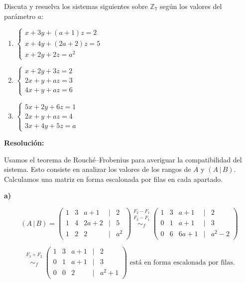 \documentclass[a4paper,12pt]{article}
\begin{document}
\begin{ejercicio}[title=Ejercicio 30]
Discuta y resuelva los sistemas siguientes sobre $\mathbb{Z}_7$ según los valores del parámetro $a$:

\begin{enumerate}
\item[a)] 
$\begin{cases}
x + 3y + (a + 1)z = 2\\
x + 4y + (2a + 2)z = 5\\
x + 2y + 2z = a^2
\end{cases}$

\item[b)] 
$\begin{cases}
x + 2y + 3z = 2\\
2x + y + a z = 3\\
4x + y + a z = 6
\end{cases}$

\item[c)] 
$\begin{cases}
5x + 2y + 6z = 1\\
2x + y + a z = 4\\
3x + 4y + 5z = a
\end{cases}$
\end{enumerate}

\tcblower
\textbf{Resolución:}

Usamos el teorema de Rouché–Frobenius para averiguar la compatibilidad del sistema. Esto consiste en analizar los valores de los rangos de $A$ y $(A\,|\,B)$. Calculamos una matriz en forma escalonada por filas en cada apartado.

\textbf{a)}

\[
(A\,|\,B)=
\begin{pmatrix}
1 & 3 & a+1 &\Big|& 2\\
1 & 4 & 2a+2 &\Big|& 5\\
1 & 2 & 2 &\Big|& a^2
\end{pmatrix}
\overset{\substack{F_2 - F_1 \\ F_3 - F_1}}{\sim_f}
\begin{pmatrix}
1 & 3 & a+1 &\Big|& 2\\
0 & 1 & a+1 &\Big|& 3\\
0 & 6 & 6a+1 &\Big|& a^2-2
\end{pmatrix}
\]

\[
\overset{\substack{F_3 + F_2\\{}}}{\sim_f}
\begin{pmatrix}
1 & 3 & a+1 &\Big|& 2\\
0 & 1 & a+1 &\Big|& 3\\
0 & 0 & 2 &\Big|& a^2+1
\end{pmatrix}
\text{ está en forma escalonada por filas.}
\]


\end{ejercicio}
\end{document}
